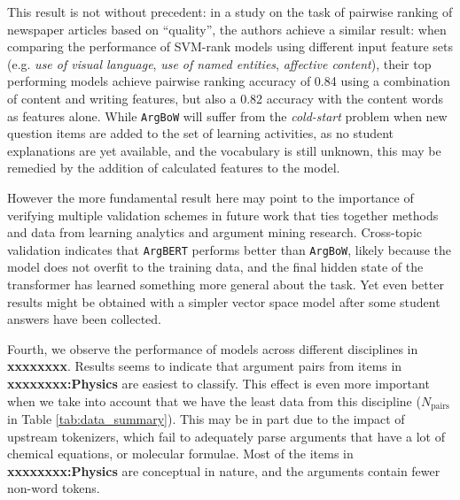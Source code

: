 \documentclass[runningheads]{llncs}
\begin{document}
This result is not without precedent: in a study on the task of pairwise 
ranking of newspaper articles based on ``quality'', the authors achieve a 
similar result: when comparing the performance of SVM-rank models using 
different input feature sets (e.g. \textit{use of visual language}, \textit{use 
of named entities}, \textit{affective content}), their top performing models 
achieve pairwise ranking accuracy of 0.84 using a combination of content and 
writing features, but also a 0.82 accuracy with the content words as features 
alone\cite{louis_what_2013}.
While \verb|ArgBoW| will suffer from the \textit{cold-start} problem when new 
question items are added to the set of learning activities, as no student 
explanations are yet available, and the vocabulary is still unknown, this may 
be remedied by the addition of calculated features to the model.

However the more fundamental result here may point to the importance of 
verifying multiple validation schemes in future work that ties together methods 
and data from learning analytics and argument mining research. 
Cross-topic validation indicates that \verb|ArgBERT| performs better than 
\verb|ArgBoW|, likely because the model does not overfit to the training data, 
and the final hidden state of the transformer has learned something more 
general about the task.
Yet even better results might be obtained with a simpler vector space model 
after some student answers have been collected.

Fourth, we observe the performance of models across different disciplines in 
\textbf{xxxxxxxx}. 
Results seems to indicate that argument pairs from items in 
\textbf{xxxxxxxx:Physics} are easiest to classify.
This effect is even more important when we take into account that we have the 
least data from this discipline ($N_{\mathrm{pairs}}$ in Table \ref{tab:data_summary}).
This may be in part due to the impact of upstream tokenizers, which fail to 
adequately parse arguments that have a lot of chemical equations, or molecular 
formulae.
Most of the items in \textbf{xxxxxxxx:Physics} are conceptual in nature, and 
the 
arguments contain fewer non-word tokens.
 
\end{document}
